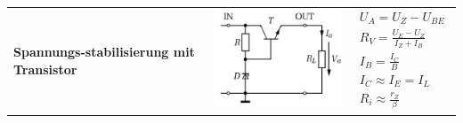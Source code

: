 \begin{longtable}{|l|l|l|}
	\hline
		\begin{minipage}{4cm}
			\textbf{Spannungs-stabilisierung mit Transistor}
		\end{minipage}
	&
		\begin{minipage}{6cm}
			\includegraphics[width=6cm]{images/transistorStabilisierung}
		\end{minipage}
	&
		\begin{minipage}{8cm}
			\begin{gather*}
				U_{A}=U_{Z}-U_{BE}\\
				R_{V}=\frac{U_{E}-U_{Z}}{I_{Z}+I_{B}}\\
				I_{B}=\frac{I_{C}}{B}\\
				I_{C} \approx I_E = I_L \\
				R_{i}\approx\frac{r_{Z}}{\beta} 
			\end{gather*}
			

\end{minipage}
\end{longtable}
